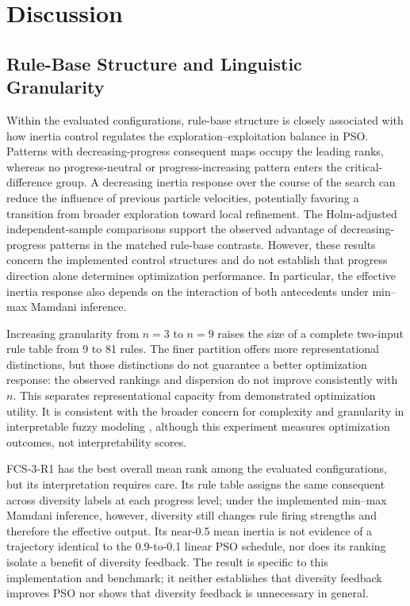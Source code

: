 \section{Discussion}
\label{sec:discussion}

\subsection{Rule-Base Structure and Linguistic Granularity}
\label{subsec:discussion_rules_vs_granularity}

Within the evaluated configurations, rule-base structure is closely associated with how inertia control regulates the exploration--exploitation balance in PSO. Patterns with decreasing-progress consequent maps occupy the leading ranks, whereas no progress-neutral or progress-increasing pattern enters the critical-difference group. A decreasing inertia response over the course of the search can reduce the influence of previous particle velocities, potentially favoring a transition from broader exploration toward local refinement. The Holm-adjusted independent-sample comparisons support the observed advantage of decreasing-progress patterns in the matched rule-base contrasts. However, these results concern the implemented control structures and do not establish that progress direction alone determines optimization performance. In particular, the effective inertia response also depends on the interaction of both antecedents under min--max Mamdani inference.


Increasing granularity from $n=3$ to $n=9$ raises the size of a complete two-input rule table from 9 to 81 rules. The finer partition offers more representational distinctions, but those distinctions do not guarantee a better optimization response: the observed rankings and dispersion do not improve consistently with $n$. This separates representational capacity from demonstrated optimization utility. It is consistent with the broader concern for complexity and granularity in interpretable fuzzy modeling \cite{Gacto2011,Castiello2019}, although this experiment measures optimization outcomes, not interpretability scores.

FCS-3-R1 has the best overall mean rank among the evaluated configurations, but its interpretation requires care. Its rule table assigns the same consequent across diversity labels at each progress level; under the implemented min--max Mamdani inference, however, diversity still changes rule firing strengths and therefore the effective output. Its near-0.5 mean inertia is not evidence of a trajectory identical to the 0.9-to-0.1 linear PSO schedule, nor does its ranking isolate a benefit of diversity feedback. The result is specific to this implementation and benchmark; it neither establishes that diversity feedback improves PSO nor shows that diversity feedback is unnecessary in general.

